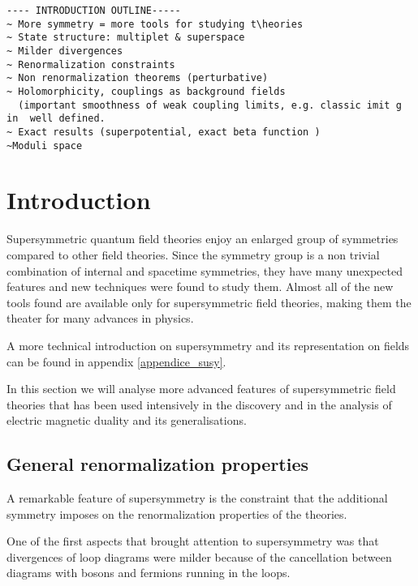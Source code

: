 \begin{lstlisting}
---- INTRODUCTION OUTLINE-----
~ More symmetry = more tools for studying t\heories
~ State structure: multiplet & superspace
~ Milder divergences 
~ Renormalization constraints
~ Non renormalization theorems (perturbative)
~ Holomorphicity, couplings as background fields 
  (important smoothness of weak coupling limits, e.g. classic imit g in  well defined.
~ Exact results (superpotential, exact beta function )
~Moduli space
\end{lstlisting}





\section{Introduction}
Supersymmetric quantum field theories enjoy an enlarged group of  symmetries compared to other field theories. 
Since the symmetry group is a non trivial combination of internal and spacetime symmetries, they have many unexpected features and new techniques were found to study them.
Almost all of the new tools found are available only for supersymmetric field theories, making them the theater for many advances in physics. 

A more technical introduction on supersymmetry and its representation on fields can be found in appendix \ref{appendice_susy}.

In this section we will analyse more advanced features of supersymmetric field theories that has been used intensively in the discovery and in the analysis of electric magnetic duality and its generalisations.













\subsection{General renormalization properties}

A remarkable feature of supersymmetry is the constraint that the additional symmetry imposes on the renormalization properties of the theories.

One of the first aspects that brought attention to supersymmetry was that divergences of loop diagrams were milder because of the cancellation between diagrams with bosons and fermions running in the loops. 

